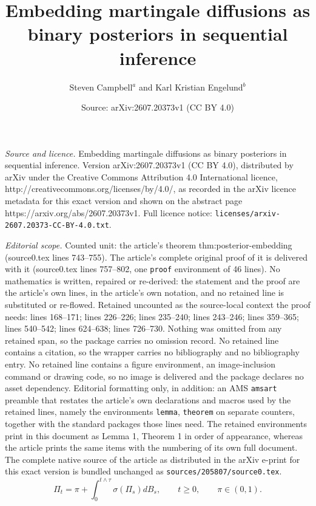 \documentclass[10pt,a4paper]{amsart}
\title{Embedding martingale diffusions as binary posteriors in sequential inference}
\author{Steven Campbell$^a$ and Karl Kristian Engelund$^b$}
\date{Source: arXiv:2607.20373v1 (CC BY 4.0)}
\begin{document}
\maketitle

\noindent\emph{Source and licence.} Embedding martingale diffusions as binary posteriors in sequential inference. Version arXiv:2607.20373v1 (CC BY 4.0), distributed by arXiv under the Creative Commons Attribution 4.0 International licence, http://creativecommons.org/licenses/by/4.0/, as recorded in the arXiv licence metadata for this exact version and shown on the abstract page https://arxiv.org/abs/2607.20373v1. Full licence notice: \texttt{licenses/arxiv-2607.20373-CC-BY-4.0.txt}.\par\smallskip

\noindent\textit{Editorial scope.} Counted unit: the article's theorem thm:posterior-embedding (source0.tex lines 743--755). The article's complete original proof of it is delivered with it (source0.tex lines 757--802, one \texttt{proof} environment of 46 lines). No mathematics is written, repaired or re-derived: the statement and the proof are the article's own lines, in the article's own notation, and no retained line is substituted or re-flowed.  Retained uncounted as the source-local context the proof needs: lines 168--171; lines 226--226; lines 235--240; lines 243--246; lines 359--365; lines 540--542; lines 624--638; lines 726--730.  Nothing was omitted from any retained span, so the package carries no omission record.  No retained line contains a citation, so the wrapper carries no bibliography and no bibliography entry.  No retained line contains a figure environment, an image-inclusion command or drawing code, so no image is delivered and the package declares no asset dependency.  Editorial formatting only, in addition: an AMS \texttt{amsart} preamble that restates the article's own declarations and macros used by the retained lines, namely the environments \texttt{lemma}, \texttt{theorem} on separate counters, together with the standard packages those lines need.  The retained environments print in this document as Lemma 1, Theorem 1 in order of appearance, whereas the article prints the same items with the numbering of its own full document.  The complete native source of the article as distributed in the arXiv e-print for this exact version is bundled unchanged as \texttt{sources/205807/source0.tex}.
\begin{equation}\label{eq:intro-target}
\Pi_t=\pi+\int_0^{t\wedge\tau}\sigma(\Pi_s)dB_s,
  \qquad t\geq0, \qquad \pi\in(0,1).
\end{equation}
\end{document}
